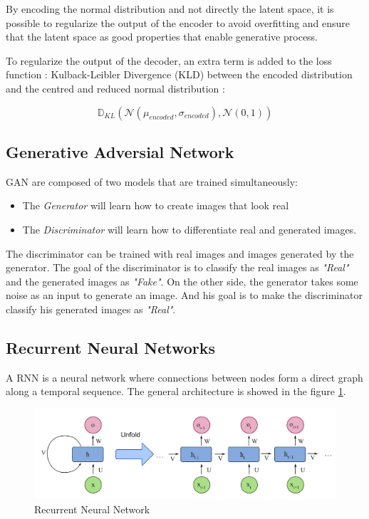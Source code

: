 \documentclass[12pt]{report}
\begin{document}
By encoding the normal distribution and not directly the latent space, it is possible to regularize the output of the encoder to avoid overfitting and ensure that the latent space as good properties that enable generative process.

To regularize the output of the decoder, an extra term is added to the loss function : Kulback-Leibler Divergence (KLD) between the encoded distribution and the centred and reduced normal distribution :

\begin{equation}
    \mathbb{D}_{KL} (\mathcal{N}(\mu_{encoded}, \sigma_{encoded}), \mathcal{N}(0, 1))
\end{equation}

\subsection{Generative Adversial Network}

GAN are composed of two models that are trained simultaneously:
\begin{itemize}
    \item The \textit{Generator} will learn how to create images that look real
    \item The \textit{Discriminator} will learn how to differentiate real and generated images.
\end{itemize}

The discriminator can be trained with real images and images generated by the generator. The goal of the discriminator is to classify the real images as \textit{"Real"} and the generated images as \textit{"Fake"}.
On the other side, the generator takes some noise as an input to generate an image. And his goal is to make the discriminator classify his generated images as \textit{"Real"}.

\subsection{Recurrent Neural Networks}

A RNN is a neural network where connections between nodes form a direct graph along a temporal sequence. The general architecture is showed in the figure \ref{fig:rnn}.

\begin{figure}[H]
    \centering
    \includegraphics[width=0.75 \textwidth]{images/nn/architectures/rnn.jpg}
    \caption{Recurrent Neural Network}
    \label{fig:rnn}
\end{figure}
\end{document}
